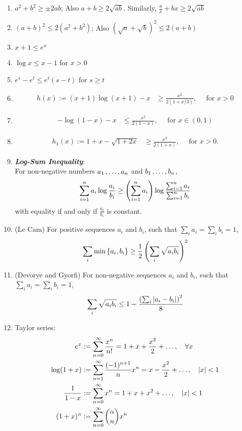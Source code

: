 \documentclass[11pt]{article}
\begin{document}
\begin{itemize}
\begin{remark}
\begin{enumerate}
\item $a^2 + b^2 \ge \pm 2ab$; Also $a + b \ge 2\sqrt{ab}$. Similarly, $\frac{a}{x} + bx \ge 2\sqrt{ab}$
\item  $(a + b)^2 \le 2(a^2 + b^2)$; Also $(\sqrt{a} + \sqrt{b})^2 \le 2(a + b)$
\item $x + 1 \le e^x$ 
\item $\log x \le x - 1$ for $x > 0$ 
\item $e^s - e^t \le e^t(s - t)$  for $s \ge t$
\item \begin{align*}
h(x) := (x + 1)\log(x + 1) - x &\ge \frac{x^2}{2(1 + x/3)}, \quad \text{ for }x >0 
\end{align*} 
\item \begin{align*}
-\log(1- x) - x &\le \frac{x^2}{2(1 - x)}, \quad \text{ for }x \in (0, 1) 
\end{align*}
\item \begin{align*}
h_1(x) := 1 + x - \sqrt{1 + 2x} &\ge \frac{x^2}{2(1 + x)}, \quad \text{ for }x > 0.
\end{align*}
\item \textbf{\emph{Log-Sum Inequality}}:\\
 For non-negative numbers $a_1 \,{,}\ldots{,}\, a_n$ and $b_1 \,{,}\ldots{,}\, b_n$,
\begin{align*}
\sum_{i=1}^{n}a_i \log\frac{a_i}{b_i} \ge \left(\sum_{i=1}^{n}a_i\right) \log\frac{\sum_{i=1}^{n}a_i}{\sum_{i=1}^{n}b_i} 
\end{align*} with equality if and only if $\frac{a_i}{b_i}$ is constant.
\item (Le Cam) For positive sequences $a_i$ and $b_i$, such that $\sum_i a_i = \sum_i b_i = 1$,
\begin{align*}
\sum_i \min\left\{a_i, b_i\right\} \ge \frac{1}{2}\left(\sum_i\sqrt{a_i b_i}\right)^2
\end{align*}
\item (Devorye and Gyorfi) For non-negative sequences $a_i$ and $b_i$, such that $\sum_i a_i = \sum_i b_i = 1$,
\begin{align*}
\sum_i \sqrt{a_i b_i} \le 1 - \frac{\left(\sum_i \left\lvert a_i - b_i \right\rvert\right)^2}{8}
\end{align*}
\item Taylor series: 
\begin{align*}
e^x &:= \sum_{n=0}^{\infty} \frac{x^n}{n!} = 1+ x + \frac{x^2}{2} + \ldots, \quad \forall x \\
\log(1 + x) &:= \sum_{n=1}^{\infty}\frac{(-1)^{n+1}}{n}x^n = x - \frac{x^2}{2} + \ldots, \quad \left\lvert x \right\rvert < 1\\
\frac{1}{1 - x}&:=  \sum_{n=0}^{\infty} x^n = 1 + x + x^2 + \ldots, \quad \left\lvert x \right\rvert < 1\\
(1 + x)^{\alpha} &:= \sum_{n=0}^{\infty}{\alpha \choose n} x^n
\end{align*}
\end{enumerate}
\end{remark}
\end{itemize}
\end{document}
